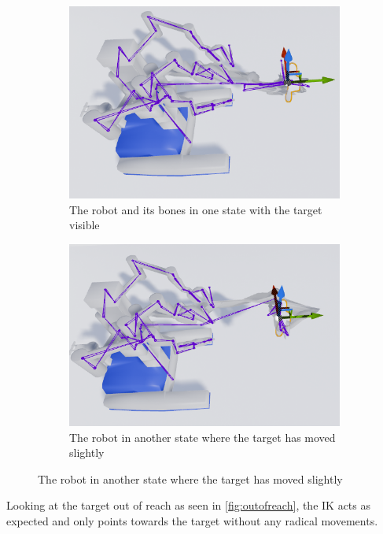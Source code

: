 \begin{figure}[H]
\begin{subfigure}[b]{0.48\textwidth}
\includegraphics[width=1\textwidth]{FABRIK/Robot_state1.PNG}
\caption{The robot and its bones in one state with the target visible}
\end{subfigure} 
\begin{subfigure}[b]{0.48\textwidth}
\includegraphics[width=1\textwidth]{FABRIK/Robot_state2.PNG}
\caption{The robot in another state where the target has moved slightly}
\end{subfigure}
\label{fig:results}
\end{figure}


Looking at the target out of reach as seen in \autoref{fig:outofreach}, the IK acts as expected and only points towards the target without any radical movements. 

